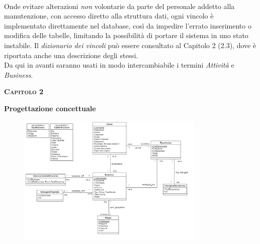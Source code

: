 \documentclass[a4paper,12pt]{article}
\begin{document}
{\vspace*{+0.2cm}
\\Onde evitare alterazioni {\it non} volontarie da parte del personale addetto alla manutenzione, con accesso diretto alla struttura dati, ogni vincolo è implementato direttamente nel database, così da impedire l'errato inserimento o modifica delle tabelle, limitando la possibilità di portare il sistema in uno stato instabile. Il \textit{dizionario dei vincoli} può essere consultato al Capitolo 2 (2.3), dove è riportata anche una descrizione degli stessi.
\vspace*{+0.2cm}
\\Da qui in avanti saranno usati in modo intercambiabile i termini \textit{Attività} e \textit{Business}.
}

\newpage 


\newpage\null{}\setcounter{page}{4}
\begin{flushleft}

\vspace*{+1cm}
\Large\textsc{\bf Capitolo 2}
\vspace*{+1cm}

\begingroup
\fontsize{30pt}{12pt}\selectfont\bf{Progettazione concettuale}
\endgroup
\vspace*{+1cm}
\end{flushleft}

\begin{center}
	\begin{figure}[h]
	\centering
 	\includegraphics[width=0.8\textwidth]{classDiagram.png}
	\end{figure}

\end{center}
\end{document}

